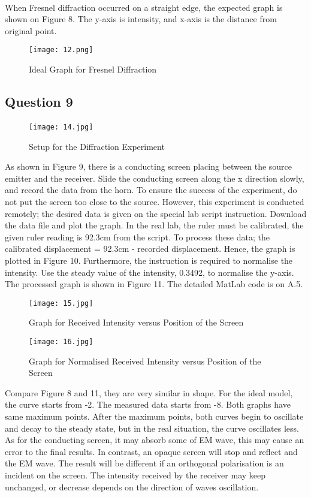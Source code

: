 \documentclass[12pt]{article}
\begin{document}
    \paragraph{}
    When Fresnel diffraction occurred on a straight edge, the expected graph is shown on Figure 8. The y-axis is intensity, and x-axis is the distance from original point.
    \begin{figure}[H]
    \centering
    \texttt{[image: 12.png]}
    \caption{Ideal Graph for Fresnel Diffraction}
    \end{figure}
    
    \subsection{Question 9}
    \paragraph{}
    \begin{figure}[H]
    \centering
    \texttt{[image: 14.jpg]}
    \caption{Setup for the Diffraction Experiment\cite{8}}
    \end{figure}
    As shown in Figure 9, there is a conducting screen placing between the source emitter and the receiver. Slide the conducting screen along the x direction slowly, and record the data from the horn. To ensure the success of the experiment, do not put the screen too close to the source. However, this experiment is conducted remotely; the desired data is given on the special lab script instruction. Download the data file and plot the graph. In the real lab, the ruler must be calibrated, the given ruler reading is 92.3cm from the script. To process these data; the calibrated displacement = 92.3cm - recorded displacement. Hence, the graph is plotted in Figure 10. Furthermore, the instruction is required to normalise the intensity. Use the steady value of the intensity, 0.3492, to normalise the y-axis. The processed graph is shown in Figure 11. The detailed MatLab code is on A.5.
    \begin{figure}[H]
    \centering
    \texttt{[image: 15.jpg]}
    \caption{Graph for Received Intensity versus Position of the Screen}
    \end{figure}
    \begin{figure}[H]
    \centering
    \texttt{[image: 16.jpg]}
    \caption{Graph for Normalised Received Intensity versus Position of the Screen}
    \end{figure}
    Compare Figure 8 and 11, they are very similar in shape. For the ideal model, the curve starts from -2. The measured data starts from -8. Both graphs have same maximum points. After the maximum points, both curves begin to oscillate and decay to the steady state, but in the real situation, the curve oscillates less. As for the conducting screen, it may absorb some of EM wave, this may cause an error to the final results. In contrast, an opaque screen will stop and reflect and the EM wave. The result will be different if an orthogonal polarisation is an incident on the screen. The intensity received by the receiver may keep unchanged, or decrease depends on the direction of waves oscillation.
    
\end{document}
